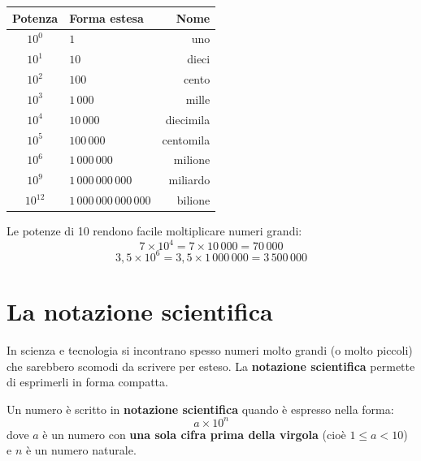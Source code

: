 \begin{center}
  \begin{tabular}{@{} c l r @{}}
    \toprule
    \textbf{Potenza} & \textbf{Forma estesa}   & \textbf{Nome} \\
    \midrule
    $10^0$           & $1$                     & uno           \\
    $10^1$           & $10$                    & dieci         \\
    $10^2$           & $100$                   & cento         \\
    $10^3$           & $1\,000$                & mille         \\
    $10^4$           & $10\,000$               & diecimila     \\
    $10^5$           & $100\,000$              & centomila     \\
    $10^6$           & $1\,000\,000$           & milione       \\
    $10^9$           & $1\,000\,000\,000$      & miliardo      \\
    $10^{12}$        & $1\,000\,000\,000\,000$ & bilione       \\
    \bottomrule
  \end{tabular}
\end{center}

\begin{esempio}
  Le potenze di 10 rendono facile moltiplicare numeri grandi:
  \[
    7 \times 10^4 = 7 \times 10\,000 = 70\,000
  \]
  \[
    3{,}5 \times 10^6 = 3{,}5 \times 1\,000\,000 = 3\,500\,000
  \]
\end{esempio}

\section{La notazione scientifica}

In scienza e tecnologia si incontrano spesso numeri molto grandi (o molto piccoli)
che sarebbero scomodi da scrivere per esteso. La \textbf{notazione scientifica}
permette di esprimerli in forma compatta.

\begin{definizione}
  Un numero è scritto in \textbf{notazione scientifica} quando è espresso nella forma:
  \[
    a \times 10^n
  \]
  dove $a$ è un numero con \textbf{una sola cifra prima della virgola}
  (cioè $1 \leq a < 10$) e $n$ è un numero naturale.
\end{definizione}

